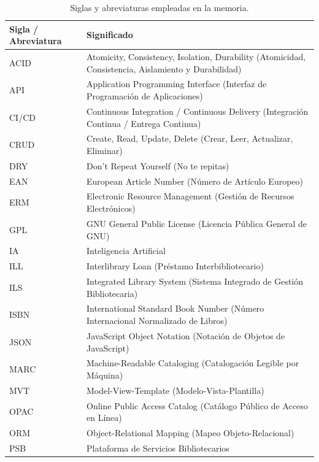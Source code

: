 \begin{table}[H]
	\centering
	\caption{Siglas y abreviaturas empleadas en la memoria.}
	\label{tab:siglas_abreviaturas}
	\begin{tabularx}{\textwidth}{l X}
		\toprule
		\textbf{Sigla / Abreviatura} & \textbf{Significado} \\
		\midrule
		ACID & Atomicity, Consistency, Isolation, Durability (Atomicidad, Consistencia, Aislamiento y Durabilidad) \\
		\addlinespace
		API & Application Programming Interface (Interfaz de Programación de Aplicaciones) \\
		\addlinespace
		CI/CD & Continuous Integration / Continuous Delivery (Integración Continua / Entrega Continua) \\
		\addlinespace
		CRUD & Create, Read, Update, Delete (Crear, Leer, Actualizar, Eliminar) \\
		\addlinespace
		DRY & Don't Repeat Yourself (No te repitas) \\
		\addlinespace
		EAN & European Article Number (Número de Artículo Europeo) \\
		\addlinespace
		ERM & Electronic Resource Management (Gestión de Recursos Electrónicos) \\
		\addlinespace
		GPL & GNU General Public License (Licencia Pública General de GNU) \\
		\addlinespace
		IA & Inteligencia Artificial \\
		\addlinespace
		ILL & Interlibrary Loan (Préstamo Interbibliotecario) \\
		\addlinespace
		ILS & Integrated Library System (Sistema Integrado de Gestión Bibliotecaria) \\
		\addlinespace
		ISBN & International Standard Book Number (Número Internacional Normalizado de Libros) \\
		\addlinespace
		JSON & JavaScript Object Notation (Notación de Objetos de JavaScript) \\
		\addlinespace
		MARC & Machine-Readable Cataloging (Catalogación Legible por Máquina) \\
		\addlinespace
		MVT & Model-View-Template (Modelo-Vista-Plantilla) \\
		\addlinespace
		OPAC & Online Public Access Catalog (Catálogo Público de Acceso en Línea) \\
		\addlinespace
		ORM & Object-Relational Mapping (Mapeo Objeto-Relacional) \\
		\addlinespace
		PSB & Plataforma de Servicios Bibliotecarios \\

\end{tabularx}
\end{table}
